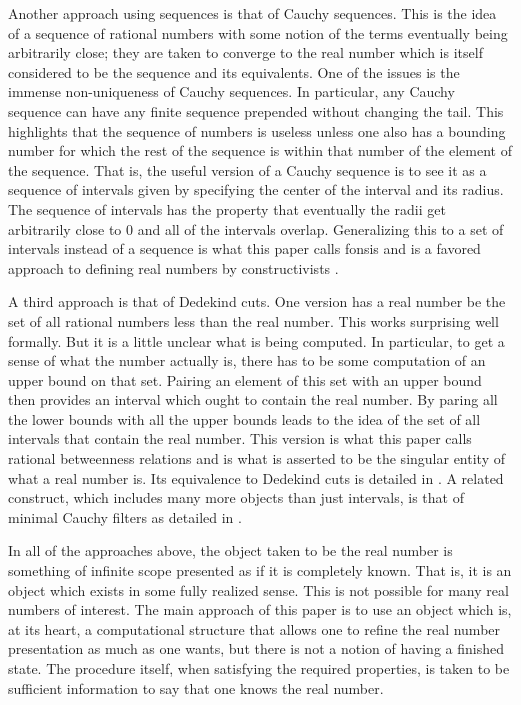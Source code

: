 \documentclass[12pt]{article}
\begin{document}
Another approach using sequences is that of Cauchy sequences. This is the idea of a sequence of rational numbers  with some notion of the terms eventually being arbitrarily close; they are taken to converge to the real number which is itself considered to be the sequence and its equivalents. One of the issues is the immense non-uniqueness of Cauchy sequences. In particular, any Cauchy sequence can have any finite sequence prepended without changing the tail. This highlights that the sequence of numbers is useless unless one also has a bounding number for which the rest of the sequence is within that number of the element of the sequence. That is, the useful version of a Cauchy sequence is to see it as a sequence of intervals given by specifying the center of the interval and its radius. The sequence of intervals has the property that eventually the radii get arbitrarily close to 0 and all of the intervals overlap. Generalizing this to a set of intervals instead of a sequence is what this paper calls fonsis and is a favored approach to defining real numbers by constructivists \cite{bridger}.

A third approach is that of Dedekind cuts. One version has a real number be the set of all rational numbers less than the real number. This works surprising well formally. But it is a little unclear what is being computed. In particular, to get a sense of what the number actually is, there has to be some computation of an upper bound on that set. Pairing an element of this set with an upper bound then provides an interval which ought to contain the real number. By paring all the lower bounds with all the upper bounds leads to the idea of the set of all intervals that contain the real number. This version is what this paper calls rational betweenness relations and is what is asserted to be the singular entity of what a real number is. Its equivalence to Dedekind cuts is detailed in \cite{taylor24dedekind}. A related construct, which includes many more objects than just intervals, is that of minimal Cauchy filters as detailed in \cite{ittay-2015}.

In all of the approaches above, the object taken to be the real number is something of infinite scope presented as if it is completely known. That is, it is an object which exists in some fully realized sense. This is not possible for many real numbers of interest. The main approach of this paper is to use an object which is, at its heart, a computational structure that allows one to refine the real number presentation as much as one wants, but there is not a notion of having a finished state. The procedure itself, when satisfying the required properties, is taken to be sufficient information to say that one knows the real number. 
\end{document}
